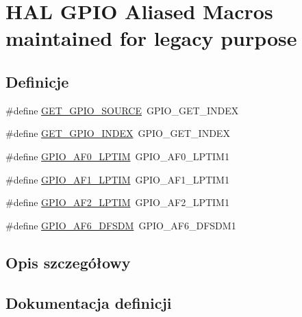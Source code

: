 \hypertarget{group___h_a_l___g_p_i_o___aliased___macros}{}\section{H\+AL G\+P\+IO Aliased Macros maintained for legacy purpose}
\label{group___h_a_l___g_p_i_o___aliased___macros}
\subsection*{Definicje}
\begin{DoxyCompactItemize}
\item 
\#define \hyperlink{group___h_a_l___g_p_i_o___aliased___macros_ga519fafd507db0341f56b24e6f5509561}{G\+E\+T\+\_\+\+G\+P\+I\+O\+\_\+\+S\+O\+U\+R\+CE}~G\+P\+I\+O\+\_\+\+G\+E\+T\+\_\+\+I\+N\+D\+EX
\item 
\#define \hyperlink{group___h_a_l___g_p_i_o___aliased___macros_ga1c140fcfc79bb7185eed044b05792d70}{G\+E\+T\+\_\+\+G\+P\+I\+O\+\_\+\+I\+N\+D\+EX}~G\+P\+I\+O\+\_\+\+G\+E\+T\+\_\+\+I\+N\+D\+EX
\item 
\#define \hyperlink{group___h_a_l___g_p_i_o___aliased___macros_gab7abf9473a43a0b3d2c494d9946ef5ab}{G\+P\+I\+O\+\_\+\+A\+F0\+\_\+\+L\+P\+T\+IM}~G\+P\+I\+O\+\_\+\+A\+F0\+\_\+\+L\+P\+T\+I\+M1
\item 
\#define \hyperlink{group___h_a_l___g_p_i_o___aliased___macros_ga4dd6c2f7aa06ea43dd9e6fe568c34e60}{G\+P\+I\+O\+\_\+\+A\+F1\+\_\+\+L\+P\+T\+IM}~G\+P\+I\+O\+\_\+\+A\+F1\+\_\+\+L\+P\+T\+I\+M1
\item 
\#define \hyperlink{group___h_a_l___g_p_i_o___aliased___macros_ga93742854899db59892aa438ce7c8a2d6}{G\+P\+I\+O\+\_\+\+A\+F2\+\_\+\+L\+P\+T\+IM}~G\+P\+I\+O\+\_\+\+A\+F2\+\_\+\+L\+P\+T\+I\+M1
\item 
\#define \hyperlink{group___h_a_l___g_p_i_o___aliased___macros_ga9c9e931dff3a4678b468c65b16f6f87e}{G\+P\+I\+O\+\_\+\+A\+F6\+\_\+\+D\+F\+S\+DM}~G\+P\+I\+O\+\_\+\+A\+F6\+\_\+\+D\+F\+S\+D\+M1
\end{DoxyCompactItemize}


\subsection{Opis szczegółowy}


\subsection{Dokumentacja definicji}
\mbox{\label{group___h_a_l___g_p_i_o___aliased___macros_ga1c140fcfc79bb7185eed044b05792d70}} 
